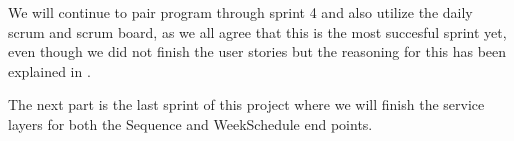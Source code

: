 We will continue to pair program through sprint 4 and also utilize the daily scrum and scrum board, as we all agree that this is the most succesful sprint yet, even though we did not finish the user stories but the reasoning for this has been explained in .

The next part is the last sprint of this project where we will finish the service layers for both the Sequence and WeekSchedule end points.